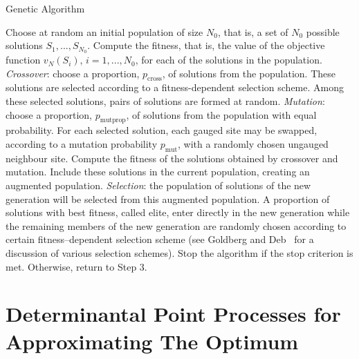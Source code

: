 \documentclass[]{interact}
\theoremstyle{plain}%
\theoremstyle{definition}
\theoremstyle{remark}
\newcommand{\matr}[1]{\bm{#1}}
\begin{document}
\begin{algorithm}[tbh]
\caption{Genetic Algorithm}
\label{alg:GA}
\begin{algorithmic}[1]
\STATE Choose at random an initial population of size $N_0$, that is, a set of $N_0$ possible solutions $S_1,...,S_{N_0}$.
\STATE Compute the fitness, that is, the value of the objective function $v_{N}(S_i)$, $i = 1,...,N_0$, for each of the solutions in the population.
\STATE \textit{Crossover}: choose a proportion, $p_{\text{cross}}$, of solutions from the population. These solutions are selected according to a fitness-dependent selection scheme. Among these selected solutions, pairs of solutions are formed at random.
\STATE \textit{Mutation}: choose a proportion, $p_{\text{mutprop}}$, of solutions from the population with equal probability. For each selected solution, each gauged site may be swapped, according to a mutation probability $p_{\text{mut}}$, with a randomly chosen ungauged neighbour site.
\STATE Compute the fitness of the solutions obtained by crossover and mutation. Include these solutions in the current population, creating an augmented population.
\STATE \textit{Selection}: the population of solutions of the new generation will be selected from this augmented population. A proportion of solutions with best fitness, called elite, enter directly in the new generation while the remaining members of the new generation are randomly chosen according to certain fitness--dependent selection scheme (see Goldberg and Deb~\cite{GoldbergDeb} for a discussion of various selection schemes).
\STATE Stop the algorithm if the stop criterion is met. Otherwise, return to Step 3.
\end{algorithmic}
\end{algorithm}



\section{Determinantal Point Processes for Approximating The Optimum}\label{dpp}
\end{document}
